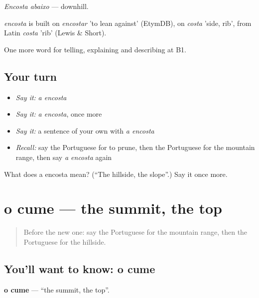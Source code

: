 \emph{Encosta abaixo} — downhill.

\begin{cousinweb}
\emph{encosta} is built on \emph{encostar} 'to lean against' (EtymDB), on \emph{costa} 'side, rib', from Latin \emph{costa} 'rib' (Lewis \& Short).
\end{cousinweb}

\begin{grammarlens}[title={What you've built}]
One more word for telling, explaining and describing at B1.
\end{grammarlens}

\subsection*{Your turn}
\begin{itemize}
\raggedright
  \item \emph{Say it:} \emph{a encosta}
  \item \emph{Say it:} \emph{a encosta}, once more
  \item \emph{Say it:} a sentence of your own with \emph{a encosta}
  \item \emph{Recall:} say the Portuguese for to prune, then the Portuguese for the mountain range, then say \emph{a encosta} again
\end{itemize}

\begin{tcolorbox}[breakable,colback=teal!4,colframe=teal!35!black,title={Before you move on}]
What does a encosta mean? (\textquotedblleft{}The hillside, the slope\textquotedblright{}.) Say it once more.
\end{tcolorbox}
\section[o cume]{o cume — the summit, the top}

\label{lesson:PT-C458-cume}



\begin{quote}
Before the new one: say the Portuguese for the mountain range, then the Portuguese for the hillside.
\end{quote}

\subsection*{You'll want to know: o cume}
\textbf{o cume} — \textquotedblleft{}the summit, the top\textquotedblright{}.

